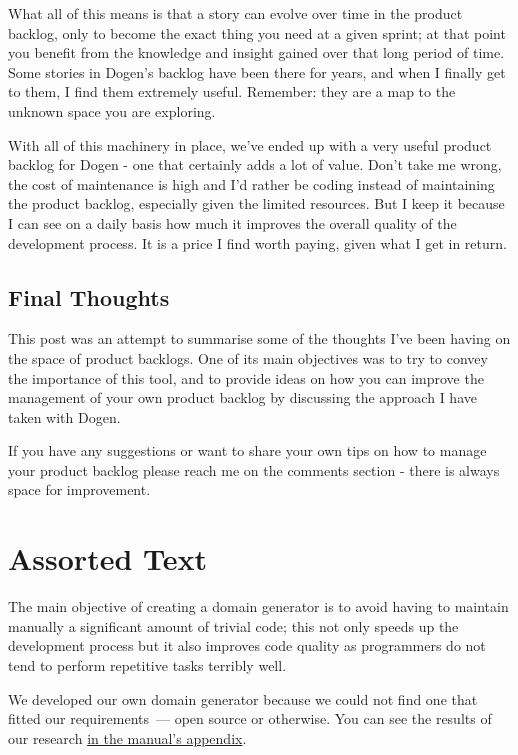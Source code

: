 \documentclass{book}
\begin{document}
What all of this means is that a story can evolve over time in the
product backlog, only to become the exact thing you need at a given
sprint; at that point you benefit from the knowledge and insight
gained over that long period of time. Some stories in Dogen's backlog
have been there for years, and when I finally get to them, I find them
extremely useful. Remember: they are a map to the unknown space you
are exploring.

With all of this machinery in place, we've ended up with a very useful
product backlog for Dogen - one that certainly adds a lot of
value. Don't take me wrong, the cost of maintenance is high and I'd
rather be coding instead of maintaining the product backlog,
especially given the limited resources. But I keep it because I can
see on a daily basis how much it improves the overall quality of the
development process. It is a price I find worth paying, given what I
get in return.

\section*{Final Thoughts}
\label{sec-6}

This post was an attempt to summarise some of the thoughts I've been
having on the space of product backlogs. One of its main objectives
was to try to convey the importance of this tool, and to provide ideas
on how you can improve the management of your own product backlog by
discussing the approach I have taken with Dogen.

If you have any suggestions or want to share your own tips on how to
manage your product backlog please reach me on the comments section -
there is always space for improvement.

\chapter{Assorted Text}

The main objective of creating a domain generator is to avoid having
to maintain manually a significant amount of trivial code; this not
only speeds up the development process but it also improves code
quality as programmers do not tend to perform repetitive tasks
terribly well.

We developed our own domain generator because we could not find one
that fitted our requirements~--- open source or otherwise. You can see
the results of our research
\href{https://github.com/kitanda/dogen/blob/master/doc/manual/manual.org#appendix-a---related-work}{in
  the manual's appendix}.
\end{document}
